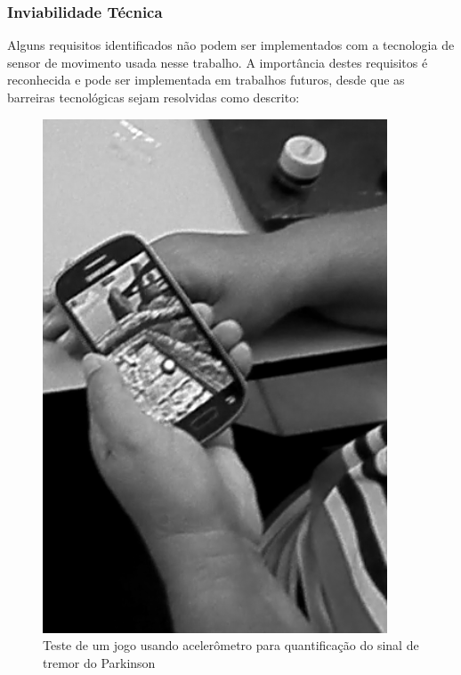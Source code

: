 \subsubsection{Inviabilidade Técnica}
Alguns requisitos identificados não podem ser implementados com a tecnologia de sensor de movimento usada nesse trabalho. A importância destes requisitos é reconhecida e pode ser implementada em trabalhos futuros, desde que as barreiras tecnológicas sejam resolvidas como descrito:
\begin{figure}[!h]
 \centering
 \includegraphics[scale=0.5]{./img/gametremor.png}
\caption{Teste de um jogo usando acelerômetro para quantificação do sinal de tremor do Parkinson}
 \label{fig:gametremor}
\end{figure}

